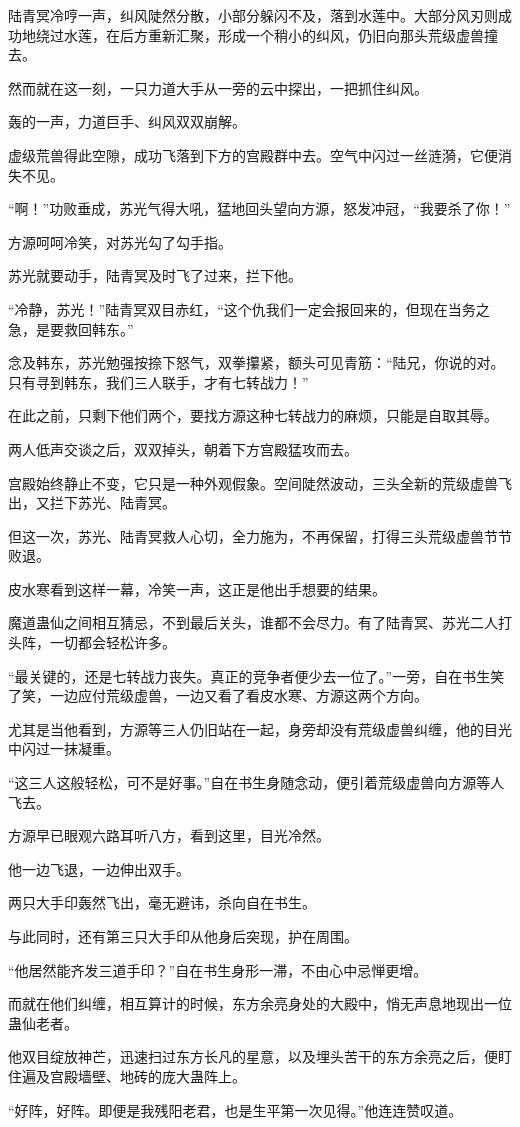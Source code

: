 \begin{this_body}
陆青冥冷哼一声，纠风陡然分散，小部分躲闪不及，落到水莲中。大部分风刃则成功地绕过水莲，在后方重新汇聚，形成一个稍小的纠风，仍旧向那头荒级虚兽撞去。

然而就在这一刻，一只力道大手从一旁的云中探出，一把抓住纠风。

轰的一声，力道巨手、纠风双双崩解。

虚级荒兽得此空隙，成功飞落到下方的宫殿群中去。空气中闪过一丝涟漪，它便消失不见。

“啊！”功败垂成，苏光气得大吼，猛地回头望向方源，怒发冲冠，“我要杀了你！”

方源呵呵冷笑，对苏光勾了勾手指。

苏光就要动手，陆青冥及时飞了过来，拦下他。

“冷静，苏光！”陆青冥双目赤红，“这个仇我们一定会报回来的，但现在当务之急，是要救回韩东。”

念及韩东，苏光勉强按捺下怒气，双拳攥紧，额头可见青筋：“陆兄，你说的对。只有寻到韩东，我们三人联手，才有七转战力！”

在此之前，只剩下他们两个，要找方源这种七转战力的麻烦，只能是自取其辱。

两人低声交谈之后，双双掉头，朝着下方宫殿猛攻而去。

宫殿始终静止不变，它只是一种外观假象。空间陡然波动，三头全新的荒级虚兽飞出，又拦下苏光、陆青冥。

但这一次，苏光、陆青冥救人心切，全力施为，不再保留，打得三头荒级虚兽节节败退。

皮水寒看到这样一幕，冷笑一声，这正是他出手想要的结果。

魔道蛊仙之间相互猜忌，不到最后关头，谁都不会尽力。有了陆青冥、苏光二人打头阵，一切都会轻松许多。

“最关键的，还是七转战力丧失。真正的竞争者便少去一位了。”一旁，自在书生笑了笑，一边应付荒级虚兽，一边又看了看皮水寒、方源这两个方向。

尤其是当他看到，方源等三人仍旧站在一起，身旁却没有荒级虚兽纠缠，他的目光中闪过一抹凝重。

“这三人这般轻松，可不是好事。”自在书生身随念动，便引着荒级虚兽向方源等人飞去。

方源早已眼观六路耳听八方，看到这里，目光冷然。

他一边飞退，一边伸出双手。

两只大手印轰然飞出，毫无避讳，杀向自在书生。

与此同时，还有第三只大手印从他身后突现，护在周围。

“他居然能齐发三道手印？”自在书生身形一滞，不由心中忌惮更增。

而就在他们纠缠，相互算计的时候，东方余亮身处的大殿中，悄无声息地现出一位蛊仙老者。

他双目绽放神芒，迅速扫过东方长凡的星意，以及埋头苦干的东方余亮之后，便盯住遍及宫殿墙壁、地砖的庞大蛊阵上。

“好阵，好阵。即便是我残阳老君，也是生平第一次见得。”他连连赞叹道。

\end{this_body}


